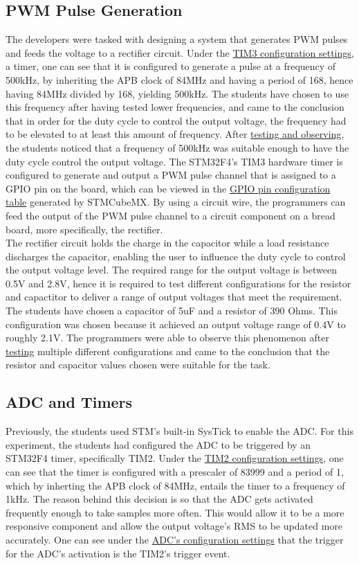 \documentclass[12pt]{report}
\begin{document}
\subsection{PWM Pulse Generation}
The developers were tasked with designing a system that generates PWM pulses and feeds the voltage
to a rectifier circuit. Under the \hyperref[appendixtim2]{TIM3 configuration settings}, a timer, one
can see that it is configured to generate a pulse at a frequency of 500kHz, by inheriting the APB
clock of 84MHz and having a period of 168, hence having 84MHz divided by 168, yielding 500kHz. The
students have chosen to use this frequency after having tested lower frequencies, and came to the
conclusion that in order for the duty cycle to control the output voltage, the frequency had to be
elevated to at least this amount of frequency. After \hyperref[testpwm]{testing and observing}, the
students noticed that a frequency of 500kHz was suitable enough to have the duty cycle control the output voltage. The STM32F4's TIM3 hardware timer is configured to generate and output a PWM pulse channel that is assigned to a GPIO pin on the board, which can be viewed in the \hyperref[pinconfig]{GPIO pin configuration table} generated by STMCubeMX. By using a circuit wire, the programmers can feed the output of the PWM pulse channel to a circuit component on a bread board, more specifically, the rectifier.\\
The rectifier circuit holds the charge in the capacitor while a load resistance discharges the capacitor, enabling the user to influence the duty cycle to control the output voltage level. The required range for the output voltage is between 0.5V and 2.8V, hence it is required to test different configurations for the resistor and capactitor to deliver a range of output voltages that meet the requirement. The students have chosen a capacitor of 5uF and a resistor of 390 Ohms. This configuration was chosen because it achieved an output voltage range of 0.4V to roughly 2.1V. The programmers were able to observe this phenomenon after \hyperref[testpwm]{testing} multiple different configurations and came to the conclusion that the resistor and capacitor values chosen were suitable for the task.

\subsection{ADC and Timers}
Previously, the students used STM's built-in SysTick to enable the ADC. For this experiment, the
students had configured the ADC to be triggered by an STM32F4 timer, specifically TIM2. Under the
\hyperref[appendixtim2]{TIM2 configuration settings}, one can see that the timer is configured with
a prescaler of 83999 and a period of 1, which by inherting the APB clock of 84MHz, entails the timer
to a frequency of 1kHz. The reason behind this decision is so that the ADC gets activated frequently enough to take samples more often. This would allow it to be a more responsive component and allow the output voltage's RMS to be updated more accurately. One can see under the \hyperref[appendixadc]{ADC's configuration settings} that the trigger for the ADC's activation is the TIM2's trigger event.
\end{document}
